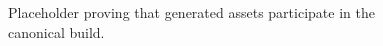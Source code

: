 \begin{figure}[htbp]
  \centering
  \caption{Placeholder proving that generated assets participate in the canonical build.}
  \label{fig:generated-asset-placeholder}
\end{figure}
